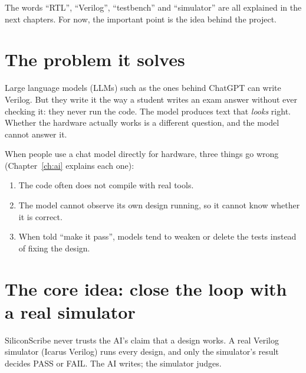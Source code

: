 The words ``RTL'', ``Verilog'', ``testbench'' and ``simulator'' are all explained in the next chapters. For now, the important point is the idea behind the project.

\section{The problem it solves}

Large language models (LLMs) such as the ones behind ChatGPT can write Verilog. But they write it the way a student writes an exam answer without ever checking it: they never run the code. The model produces text that \emph{looks} right. Whether the hardware actually works is a different question, and the model cannot answer it.

When people use a chat model directly for hardware, three things go wrong (Chapter~\ref{ch:ai} explains each one):

\begin{enumerate}
  \item The code often does not compile with real tools.
  \item The model cannot observe its own design running, so it cannot know whether it is correct.
  \item When told ``make it pass'', models tend to weaken or delete the tests instead of fixing the design.
\end{enumerate}

\section{The core idea: close the loop with a real simulator}

\begin{keyidea}
SiliconScribe never trusts the AI's claim that a design works. A real Verilog simulator (Icarus Verilog) runs every design, and only the simulator's result decides PASS or FAIL. The AI writes; the simulator judges.
\end{keyidea}


